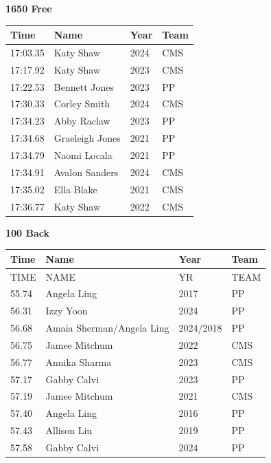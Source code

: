 \vspace{1.2em}
\noindent\begin{minipage}[t]{0.98\textwidth}
\centering
\textbf{\textcolor{teamprimary}{1650 Free}}\par
\vspace{0.5em}
\centering
\small
\renewcommand{\arraystretch}{1.0}
\setlength{\tabcolsep}{4pt}
\begin{tabular}{@{}p{2.5cm}p{4.5cm}p{1.5cm}p{2.5cm}@{}}
\toprule
\textbf{Time} & \textbf{Name} & \textbf{Year} & \textbf{Team} \\
\midrule
17:03.35 & Katy Shaw & 2024 & CMS \\
17:17.92 & Katy Shaw & 2023 & CMS \\
17:22.53 & Bennett Jones & 2023 & PP \\
17:30.33 & Corley Smith & 2024 & CMS \\
17:34.23 & Abby Raclaw & 2023 & PP \\
17:34.68 & Graeleigh Jones & 2021 & PP \\
17:34.79 & Naomi Locala & 2021 & PP \\
17:34.91 & Avalon Sanders & 2024 & CMS \\
17:35.02 & Ella Blake & 2021 & CMS \\
17:36.77 & Katy Shaw & 2022 & CMS \\
\bottomrule
\end{tabular}
\end{minipage}
\vspace{1.2em}
\noindent\begin{minipage}[t]{0.98\textwidth}
\centering
\textbf{\textcolor{teamprimary}{100 Back}}\par
\vspace{0.5em}
\centering
\small
\renewcommand{\arraystretch}{1.0}
\setlength{\tabcolsep}{4pt}
\begin{tabular}{@{}p{2.5cm}p{4.5cm}p{1.5cm}p{2.5cm}@{}}
\toprule
\textbf{Time} & \textbf{Name} & \textbf{Year} & \textbf{Team} \\
\midrule
 TIME &   NAME & YR & TEAM \\
55.74 & Angela Ling & 2017 & PP \\
56.31 & Izzy Yoon & 2024 & PP \\
56.68 & Amaia Sherman/Angela Ling & 2024/2018 & PP \\
56.75 & Jamee Mitchum & 2022 & CMS \\
56.77 & Annika Sharma & 2023 & CMS \\
57.17 & Gabby Calvi & 2023 & PP \\
57.19 & Jamee Mitchum & 2021 & CMS \\
57.40 & Angela Ling & 2016 & PP \\
57.43 & Allison Liu & 2019 & PP \\
57.58 & Gabby Calvi & 2024 & PP \\
\bottomrule
\end{tabular}
\end{minipage}
